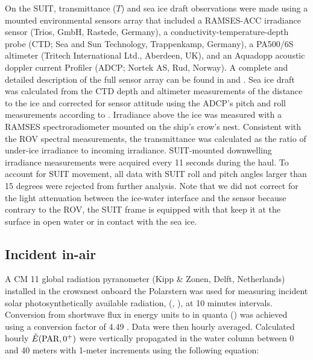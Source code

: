 On the SUIT, transmittance ($T$) and sea ice draft observations were made using a mounted environmental sensors array that included a RAMSES-ACC irradiance sensor (Trios, GmbH, Rastede, Germany), a conductivity-temperature-depth probe (CTD; Sea and Sun Technology, Trappenkamp, Germany), a PA500/6S altimeter (Tritech International Ltd., Aberdeen, UK), and an Aquadopp acoustic doppler current Profiler (ADCP; Nortek AS, Rud, Norway). A complete and detailed description of the full sensor array can be found in \citet{David2015} and \citet{Lange2016}. Sea ice draft was calculated from the CTD depth and altimeter measurements of the distance to the ice and corrected for sensor attitude using the ADCP's pitch and roll measurements according to \citet{Lange2016}. Irradiance above the ice was measured with a RAMSES spectroradiometer mounted on the ship's crow's nest. Consistent with the ROV spectral measurements, the transmittance was calculated as the ratio of under-ice irradiance to incoming irradiance. SUIT-mounted downwelling irradiance measurements were acquired every 11 seconds during the haul. To account for SUIT movement, all data with SUIT roll and pitch angles larger than 15 degrees were rejected from further analysis. Note that we did not correct for the light attenuation between the ice-water interface and the sensor because contrary to the ROV, the SUIT frame is equipped with \DIFdelbegin {}\DIFdelend \DIFaddbegin {}\DIFaddend that keep it at the surface in open water or in contact with the sea ice. 

\subsection{Incident in-air \eparscalar{}}

A CM 11 global radiation pyranometer (Kipp \& Zonen, Delft, Netherlands) installed \DIFdelbegin {}\DIFdelend in the crowsnest onboard the Polarstern was used for measuring incident solar photosynthetically available radiation, (\eparscalar{}, \wmsquare), at 10 minutes intervals. Conversion from shortwave flux in energy units to \eparscalar{} in quanta (\micromol{}) was achieved using a conversion factor of 4.49 \citep{McCree1972}. Data were then hourly averaged. Calculated hourly $\mathring{E}(\textnormal{PAR}, 0^+)$ were vertically propagated in the water column between 0 and 40 meters with 1-meter increments using the following equation:

